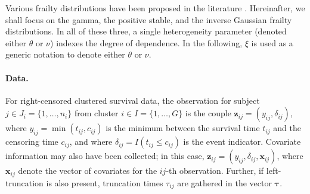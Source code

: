 Various frailty distributions have been proposed in the literature \cite[Chapter~4]{DuchateauJanssen08}. 
Hereinafter, we shall focus on
  the gamma, the positive stable, and the inverse Gaussian frailty distributions. 
In all of these three, a single heterogeneity parameter (denoted either $\theta$ or $\nu$)
  indexes the degree of dependence.
In the following, $\xi$ is used as a generic notation to denote either $\theta$ or $\nu$.



\paragraph{Data.}
For right-censored clustered survival data,
  the observation for subject $j \in J_i = \{1, \ldots , n_i \}$
  from cluster $i \in I = \{1, \ldots , G\}$ is the couple $\bm z_{ij} = (y_{ij} , \delta_{ij} )$, 
  where $y_{ij} = \min(t_{ij}, c_{ij})$ is the minimum between the survival time $t_{ij}$
    and the censoring time $c_{ij}$,
  and where $\delta_{ij} = I(t_{ij} \le c_{ij})$ is the event indicator.
  Covariate information may also have been collected; in this case, 
  $\bm z_{ij} = (y_{ij} , \delta_{ij}, \bm{x}_{ij} )$,
  where $\bm x_{ij}$ denote the vector of covariates for the $ij$-th observation.
Further, if left-truncation is also present, 
  truncation times $\tau_{ij}$ are gathered in the vector $\bm{\tau}$.



